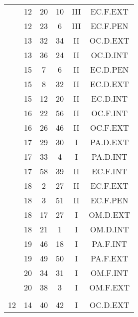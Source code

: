 \documentclass[12pt, a4paper]{article}
\begin{document}
\begin{multicols}{3}
{\begin{tabular}{c c c c c c}
	 	 	 	 & 12 & 20 & 10 & III & EC.F.EXT\\%
	 	 	 	 & 12 & 23 & 6 & III & EC.F.PEN\\%
	 	 	 	 & 13 & 32 & 34 & II & OC.D.EXT\\%
	 	 	 	 & 13 & 36 & 24 & II & OC.D.INT\\%
	 	 	 	 & 15 & 7 & 6 & II & EC.D.PEN\\%
	 	 	 	 & 15 & 8 & 32 & II & EC.D.EXT\\%
	 	 	 	 & 15 & 12 & 20 & II & EC.D.INT\\%
	 	 	 	 & 16 & 22 & 56 & II & OC.F.INT\\%
	 	 	 	 & 16 & 26 & 46 & II & OC.F.EXT\\%
	 	 	 	 & 17 & 29 & 30 & I & PA.D.EXT\\%
	 	 	 	 & 17 & 33 & 4 & I & PA.D.INT\\%
	 	 	 	 & 17 & 58 & 39 & II & EC.F.INT\\%
	 	 	 	 & 18 & 2 & 27 & II & EC.F.EXT\\%
	 	 	 	 & 18 & 3 & 51 & II & EC.F.PEN\\%
	 	 	 	 & 18 & 17 & 27 & I & OM.D.EXT\\%
	 	 	 	 & 18 & 21 & 1 & I & OM.D.INT\\%
	 	 	 	 & 19 & 46 & 18 & I & PA.F.INT\\%
	 	 	 	 & 19 & 49 & 50 & I & PA.F.EXT\\%
	 	 	 	 & 20 & 34 & 31 & I & OM.F.INT\\%
	 	 	 	 & 20 & 38 & 3 & I & OM.F.EXT\\%
	 	 	 	 & & & & & \\%
	 	 	 	12 & 14 & 40 & 42 & I & OC.D.EXT\\%
	 	 \end{tabular}
 	}
\end{multicols}
\end{document}
